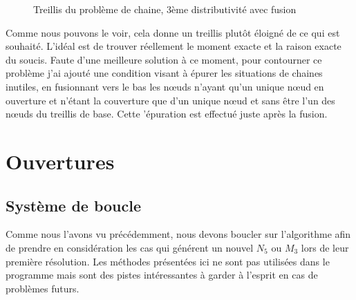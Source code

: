 \begin{figure}[H]
\begin{minipage}{0.5\textwidth}
\begin{center}
	\end{center}
	\caption{Treillis du problème de chaine, 3ème distributivité avec fusion}
	\label{pbl_v6_dist3_fusion}
	\end{minipage}
\end{figure}

Comme nous pouvons le voir, cela donne un treillis plutôt éloigné de ce qui est souhaité. L'idéal est de trouver réellement le moment exacte et la raison exacte du soucis. Faute d'une meilleure solution à ce moment, pour contourner ce problème j'ai ajouté une condition visant à épurer les situations de chaines inutiles, en fusionnant vers le bas les n\oe uds n'ayant qu'un unique n\oe ud en ouverture et n'étant la couverture que d'un unique n\oe ud et sans être l'un des n\oe uds du treillis de base. Cette 'épuration est effectué juste après la fusion. 

\section{Ouvertures}

\subsection{Système de boucle}

Comme nous l'avons vu précédemment, nous devons boucler sur l'algorithme afin de prendre en considération les cas qui générent un nouvel $N_5$ ou $M_3$ lors de leur première résolution. Les méthodes présentées ici ne sont pas utilisées dans le programme mais sont des pistes intéressantes à garder à l'esprit en cas de problèmes futurs.

